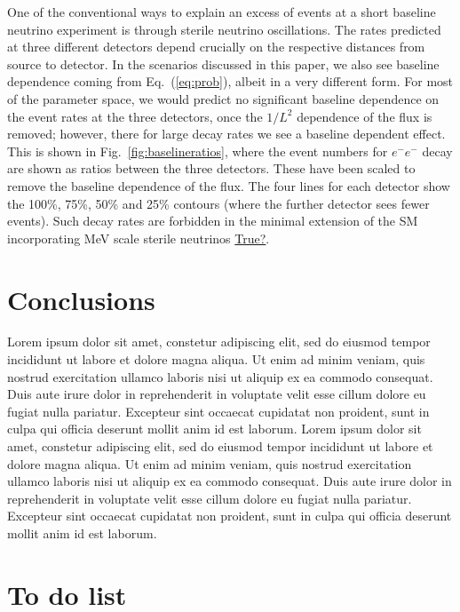 \documentclass[11pt, a4paper]{article}
\newcommand{\refeq}[1]{Eq.~(\ref{#1})}
\newcommand{\reffig}[1]{Fig.~\ref{#1}}
\newcommand{\lorem}{ \textcolor[rgb]{0.8,0.8,0.8}{Lorem ipsum dolor sit amet, constetur
adipiscing elit, sed do eiusmod tempor incididunt ut labore et dolore magna
aliqua. Ut enim ad minim veniam, quis nostrud exercitation ullamco laboris nisi
ut aliquip ex ea commodo consequat. Duis aute irure dolor in reprehenderit in
voluptate velit esse cillum dolore eu fugiat nulla pariatur. Excepteur sint
occaecat cupidatat non proident, sunt in culpa qui officia deserunt mollit anim
id est laborum.}}
\newcommand{\newtext}[2]{\textcolor{#1}{\ul{#2}}}
\begin{document}
One of the conventional ways to explain an excess of events at a short baseline
neutrino experiment is through sterile neutrino oscillations. The rates
predicted at three different detectors depend crucially on the respective
distances from source to detector. In the scenarios discussed in this paper, we
also see baseline dependence coming from \refeq{eq:prob}, albeit in a very
different form. For most of the parameter space, we would predict no
significant baseline dependence on the event rates at the three detectors, once
the $1/L^2$ dependence of the flux is removed; however, there for large decay
rates we see a baseline dependent effect. This is shown in
\reffig{fig:baselineratios}, where the event numbers for $e^-e^-$ decay are
shown as ratios between the three detectors. These have been scaled to remove
the baseline dependence of the flux.  The four lines for each detector show the
100\%, 75\%, 50\% and 25\% contours (where the further detector sees fewer
events). Such decay rates are forbidden in the minimal extension of the SM
incorporating MeV scale sterile neutrinos \newtext{PB}{True?}.  

\section{Conclusions}
\lorem\lorem


\newpage 

\section{To do list}
\end{document}
